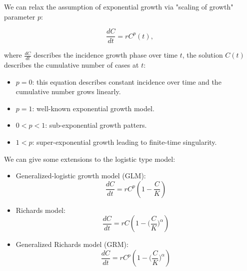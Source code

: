 \documentclass[a4paper]{extarticle}
\begin{document}
We can relax the assumption of exponential growth via "scaling of growth" parameter \(p\):

\[
    \frac{dC}{dt} = rC^{p}(t),
\]

where \(\frac{dC}{dt}\) describes the incidence growth phase over time \(t\), the solution \(C(t)\) describes the cumulative number of cases at \(t\):

\begin{itemize}
    \item \(p = 0\): this equation describes constant incidence over time and the cumulative number grows linearly.
    \item \(p = 1\): well-known exponential growth model.
    \item \(0 < p < 1\): sub-exponential growth patters.
    \item \(1 < p\): super-exponential growth leading to finite-time singularity.
\end{itemize}

We can give some extensions to the logistic type model:

\begin{itemize}
    \item Generalized-logistic growth model (GLM):
    \[
        \frac{dC}{dt} = rC^p(1 - \frac{C}{K})
    \]
    \item Richards model:
    \[
        \frac{dC}{dt} = rC(1 - \Big(\frac{C}{K}\Big)^{\alpha})
    \]
    \item Generalized Richards model (GRM):
    \[
        \frac{dC}{dt} = rC^p(1 - \Big(\frac{C}{K}\Big)^{\alpha})
    \]
\end{itemize}
\end{document}
